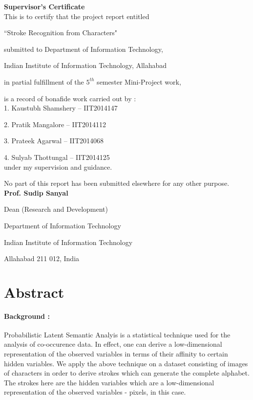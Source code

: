\documentclass[10pt]{article}
\begin{document}
	\begin{center}
		\Huge \textbf{Supervisor's Certificate}
		\\[100pt]
		\Large
		This is to certify that the project report entitled
		
		``Stroke Recognition from Characters"	
		
		submitted to Department of Information Technology,
		
		Indian Institute of Information	Technology, Allahabad
		
		in partial fulfillment of the $5^{th}$ semester Mini-Project work,
		
		is a record of bonafide work carried out by :
		\\[30pt]
		1. Kaustubh Shamshery – IIT2014147
		
		2. Pratik Mangalore – IIT2014112
		
		3. Prateek Agarwal – IIT2014068
		
		4. Sulyab Thottungal – IIT2014125
		\\[30pt]
		under my supervision and guidance.
		
		No part of this report has been submitted elsewhere for any other purpose.
		\\[100pt]
		\flushright
		\textbf{Prof. Sudip Sanyal}
		
		Dean (Research and Development)
		
		Department of Information Technology
		
		Indian Institute of Information Technology
		
		Allahabad 211 012, India
	\end{center}
	\newpage
	\hrulefill
	\tableofcontents
	\hrulefill
	\newpage
	\large
	\section{Abstract}
		\hrulefill
		\paragraph{Background :}
		Probabilistic Latent Semantic Analyis is a statistical technique used for the analysis of co-occurence data. In effect, one can derive a low-dimensional representation of the observed variables in terms of their affinity to certain hidden variables. We apply the above technique on a dataset consisting of images of characters in order to derive strokes which can generate the complete alphabet. The strokes here are the hidden variables which are a low-dimensional representation of the observed variables - pixels, in this case.
\end{document}
